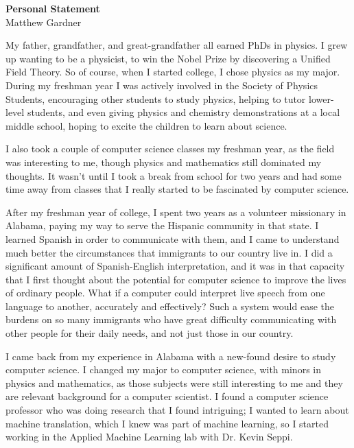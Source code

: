 \documentclass[onecolumn, 12pt]{article}
\begin{document}
\pagestyle{empty}

\begin{center}
  \textbf{Personal Statement}\\
  Matthew Gardner
\end{center}

My father, grandfather, and great-grandfather all earned PhDs in physics.  I
grew up wanting to be a physicist, to win the Nobel Prize by discovering a
Unified Field Theory.  So of course, when I started college, I chose physics as
my major.  During my freshman year I was actively involved in the Society of
Physics Students, encouraging other students to study physics, helping to tutor
lower-level students, and even giving physics and chemistry demonstrations at a
local middle school, hoping to excite the children to learn about science.

I also took a couple of computer science classes my freshman year, as the field
was interesting to me, though physics and mathematics still dominated my
thoughts.  It wasn't until I took a break from school for two years and had
some time away from classes that I really started to be fascinated by computer
science.

After my freshman year of college, I spent two years as a volunteer missionary
in Alabama, paying my way to serve the Hispanic community in that state.  I
learned Spanish in order to communicate with them, and I came to understand
much better the circumstances that immigrants to our country live in.  I did a
significant amount of Spanish-English interpretation, and it was in that
capacity that I first thought about the potential for computer science to
improve the lives of ordinary people.  What if a computer could interpret live
speech from one language to another, accurately and effectively?  Such a system
would ease the burdens on so many immigrants who have great difficulty
communicating with other people for their daily needs, and not just those in
our country.

I came back from my experience in Alabama with a new-found desire to study
computer science.  I changed my major to computer science, with minors in
physics and mathematics, as those subjects were still interesting to me and
they are relevant background for a computer scientist.  I found a computer
science professor who was doing research that I found intriguing; I wanted to
learn about machine translation, which I knew was part of machine learning, so
I started working in the Applied Machine Learning lab with Dr. Kevin Seppi.
\end{document}
